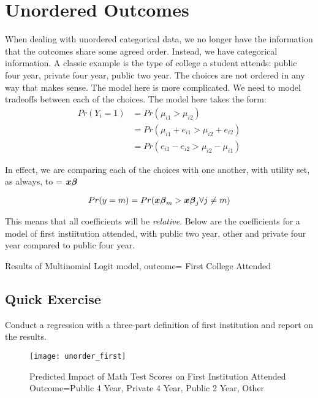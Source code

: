 \documentclass[12 pt]{article}
\begin{document}
\section{ Unordered Outcomes}
When dealing with unordered categorical data, we no longer have the information that
the outcomes share some agreed order. Instead, we have categorical information. A
classic example is the type of college a student attends: public four year, private four
year, public two year. The choices are not ordered in any way that makes sense.
The model here is more complicated. We need to model tradeoffs between each of
the choices. The model here takes the form:
\begin{align*}
  Pr(Y_i=1) & =Pr(\mu_{i1}>\mu_{i2})  \\
&=Pr( \mu_{i1} + e_{i1}  > \mu_{i2}+ e_{i2} )  \\
& = Pr( e_{i1} - e_{i2} > \mu_{i2} - \mu_{i1}  ) 
\end{align*}

In effect, we are comparing each of the choices with one another,
with utility set, as always, to = $\boldsymbol{x} \boldsymbol{\beta}$

\begin{equation*}
  Pr(y=m)=Pr(\boldsymbol{x} \boldsymbol{\beta}_m > \boldsymbol{x} \boldsymbol{\beta}_j  \forall  j
  \neq m)
\end{equation*}

This means that all coefficients will be \emph{relative}. Below are
the coefficients for a model of first instiitution attended, with
public two year, other and private four year compared to public four year. 


\begin{table}
  \centering
  \caption{Results of Multinomial Logit model, outcome= First College
    Attended}
   \begin{tiny}

  \label{tab:multi_results}
\end{tiny}
\end{table}

%                 
\clearpage


\subsection{Quick Exercise}
\label{sec:quick-exercise}

Conduct a regression with a three-part definition of first institution
and report on the results. 


\begin{figure}
  \centering
  
  \caption{Predicted Impact of Math Test Scores on First Institution Attended
    Outcome=Public 4 Year, Private 4 Year, Public 2 Year, Other}
\texttt{[image: unorder\_first]}
  \label{fig:unorder_first}
\end{figure}
\end{document}

